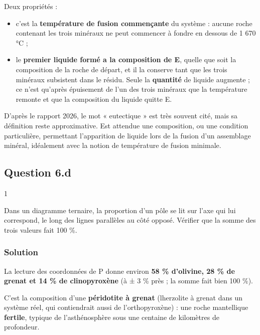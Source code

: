\documentclass[11pt,a4paper]{article}
\providecommand{\tightlist}{\setlength{\itemsep}{0pt}\setlength{\parskip}{0pt}}
\begin{document}
Deux propriétés :

\begin{itemize}
\tightlist
\item
  c'est la \textbf{température de fusion commençante} du système : aucune roche contenant les trois minéraux ne peut commencer à fondre en dessous de 1 670 °C ;
\item
  le \textbf{premier liquide formé a la composition de E}, quelle que soit la composition de la roche de départ, et il la conserve tant que les trois minéraux subsistent dans le résidu. Seule la \textbf{quantité} de liquide augmente ; ce n'est qu'après épuisement de l'un des trois minéraux que la température remonte et que la composition du liquide quitte E.
\end{itemize}

\begin{jury}

D'après le rapport 2026, le mot « eutectique » est très souvent cité, mais sa définition reste approximative. Est attendue une composition, ou une condition particulière, permettant l'apparition de liquide lors de la fusion d'un assemblage minéral, idéalement avec la notion de température de fusion minimale.

\end{jury}

\hypertarget{question-6.d}{%
\subsection{Question 6.d}\label{question-6.d}}

\begin{indication}{1}

Dans un diagramme ternaire, la proportion d'un pôle se lit sur l'axe qui lui correspond, le long des lignes parallèles au côté opposé. Vérifier que la somme des trois valeurs fait 100 \%.

\end{indication}

\hypertarget{solution-19}{%
\subsubsection{Solution}\label{solution-19}}

La lecture des coordonnées de P donne environ \textbf{58 \% d'olivine, 28 \% de grenat et 14 \% de clinopyroxène} (à ± 3 \% près ; la somme fait bien 100 \%).

C'est la composition d'une \textbf{péridotite à grenat} (lherzolite à grenat dans un système réel, qui contiendrait aussi de l'orthopyroxène) : une roche mantellique \textbf{fertile}, typique de l'asthénosphère sous une centaine de kilomètres de profondeur.
\end{document}
